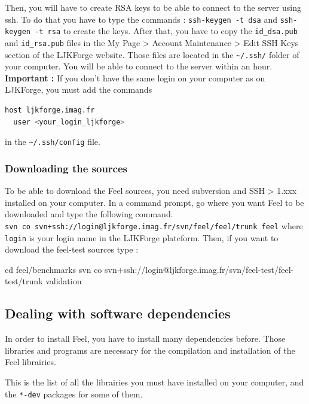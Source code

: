 \documentclass[a4paper]{book}
\newcommand{\feel}{Feel\xspace}
\begin{document}
Then, you will have to create RSA keys to be able to connect to the server
using ssh. To do that you have to type the commands :
\verb|ssh-keygen -t dsa| and \linebreak[2] \verb|ssh-keygen -t rsa| to create
the keys. After that, you have to copy the \verb|id_dsa.pub| and
\verb|id_rsa.pub| files in the My Page > Account Maintenance > Edit SSH Keys
section of the LJKForge website. Those files are located in the \verb|~/.ssh/|
folder of your computer. You will be able to connect to the server within an
hour.
\\
{\bfseries Important : } If you don't have the same login on your computer as on
LJKForge, you must add the commands
\begin{lstlisting}[language=sh]
host ljkforge.imag.fr
  user <your_login_ljkforge>
\end{lstlisting}
in the \verb|~/.ssh/config| file.

\subsubsection{Downloading the sources}
\label{sec:download-sources}

To be able to download the \feel sources, you need subversion and SSH > 1.xxx
installed on your computer. In a command prompt, go where you want \feel to be
downloaded and type the following command.
\\ \verb|svn co svn+ssh://login@ljkforge.imag.fr/svn/feel/feel/trunk feel|
where \\ \verb|login| is your login name in the LJKForge plateform. Then, if
you want to download the feel-test sources type :
\begin{unixcom}
  cd feel/benchmarks
  svn co svn+ssh://login@ljkforge.imag.fr/svn/feel-test/feel-test/trunk validation
\end{unixcom}

\subsection{Dealing with software dependencies}
\label{sec:about-dependencies}

In order to install \feel, you have to install many dependencies
before. Those libraries and programs are necessary for the
compilation and installation of the \feel librairies.

This is the list of all the librairies you must have installed on your
computer, and the \verb|*-dev| packages for some of them.
\end{document}
